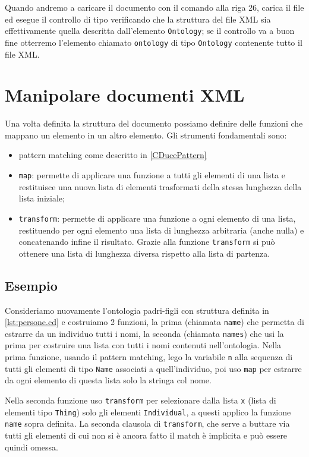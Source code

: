 Quando andremo a caricare il documento con il comando alla riga 26, \cduce carica il file ed esegue il controllo di tipo verificando che la struttura del file XML sia effettivamente quella descritta dall'elemento \verb|Ontology|; se il controllo va a buon fine otterremo l'elemento chiamato \verb|ontology| di tipo \verb|Ontology| contenente tutto il file XML.
\section{Manipolare documenti XML}
Una volta definita la struttura del documento possiamo definire delle funzioni che mappano un elemento in un altro elemento. Gli strumenti fondamentali sono:
\begin{itemize}
	\item pattern matching come descritto in \ref{CDucePattern}
	\item \verb|map|\label{map}: permette di applicare una funzione a tutti gli elementi di una lista e restituisce una nuova lista di elementi trasformati della stessa lunghezza della lista iniziale;
	\item \verb|transform|: permette di applicare una funzione a ogni elemento di una lista, restituendo per ogni elemento una lista di lunghezza arbitraria (anche nulla) e concatenando infine il risultato. Grazie alla funzione \verb|transform| si può ottenere una lista di lunghezza diversa rispetto alla lista di partenza.
\end{itemize}
\subsection{Esempio}
Consideriamo nuovamente l'ontologia padri-figli con struttura definita in \ref{lst:persone.cd} e costruiamo 2 funzioni, la prima (chiamata \verb|name|) che permetta di estrarre da un individuo tutti i nomi, la seconda (chiamata \verb|names|) che usi la prima per costruire una lista con tutti i nomi contenuti nell'ontologia.
Nella prima funzione, usando il pattern matching, lego la variabile \verb|n| alla sequenza di tutti gli elementi di tipo \verb|Name| associati a quell'individuo, poi uso \verb|map| per estrarre da ogni elemento di questa lista solo la stringa col nome.

Nella seconda funzione uso \verb|transform| per selezionare dalla lista \verb|x| (lista di elementi tipo \verb|Thing|) solo gli elementi \verb|Individual|, a questi applico la funzione \verb|name| sopra definita. La seconda clausola di \verb|transform|, che serve a buttare via tutti gli elementi di cui non si è ancora fatto il match è implicita e può essere quindi omessa.

